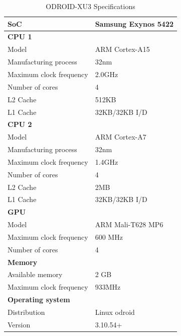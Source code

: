 \begin{table}[H]
  \begin{tabular}{ll}
    \toprule
    \textbf{SoC}              & Samsung Exynos 5422 \\
    \midrule
    \textbf{CPU 1}            &  \\
    Model                     & ARM Cortex-A15 \\
    Manufacturing process     & 32nm \\
    Maximum clock frequency   & 2.0GHz \\
    Number of cores           & 4 \\
    L2 Cache                  & 512KB \\
    L1 Cache                  & 32KB/32KB I/D \\
    \midrule
    \textbf{CPU 2}            &  \\
    Model                     & ARM Cortex-A7 \\
    Manufacturing process     & 32nm \\
    Maximum clock frequency   & 1.4GHz \\
    Number of cores           & 4 \\
    L2 Cache                  & 2MB \\
    L1 Cache                  & 32KB/32KB I/D \\
    \midrule
    \textbf{GPU}              &  \\
    Model                     & ARM Mali-T628 MP6 \\
    Maximum clock frequency   & 600 MHz \\
    Number of cores           & 4 \\
    \midrule
    \textbf{Memory}           &  \\
    Available memory          & 2 GB \\
    Maximum clock frequency   & 933MHz \\
    \midrule
    \textbf{Operating system} &  \\
    Distribution              & Linux odroid \\
    Version                   & 3.10.54+ \\
    \bottomrule
  \end{tabular}
  \caption{ODROID-XU3 Specifications\label{overflow}}
\end{table}


